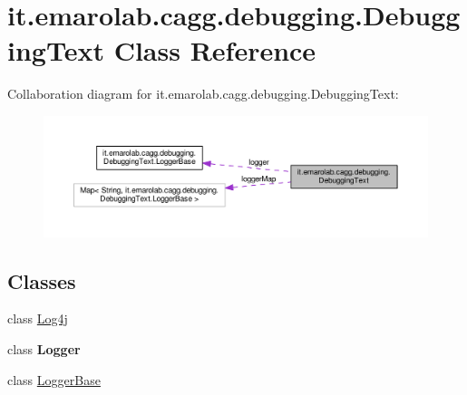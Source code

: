 \hypertarget{classit_1_1emarolab_1_1cagg_1_1debugging_1_1DebuggingText}{\section{it.\-emarolab.\-cagg.\-debugging.\-Debugging\-Text Class Reference}
\label{classit_1_1emarolab_1_1cagg_1_1debugging_1_1DebuggingText}
}


Collaboration diagram for it.\-emarolab.\-cagg.\-debugging.\-Debugging\-Text\-:\nopagebreak
\begin{figure}[H]
\begin{center}
\leavevmode
\includegraphics[width=350pt]{classit_1_1emarolab_1_1cagg_1_1debugging_1_1DebuggingText__coll__graph}
\end{center}
\end{figure}
\subsection*{Classes}
\begin{DoxyCompactItemize}
\item 
class \hyperlink{classit_1_1emarolab_1_1cagg_1_1debugging_1_1DebuggingText_1_1Log4j}{Log4j}
\item 
class {\bfseries Logger}
\item 
class \hyperlink{classit_1_1emarolab_1_1cagg_1_1debugging_1_1DebuggingText_1_1LoggerBase}{Logger\-Base}
\end{DoxyCompactItemize}
